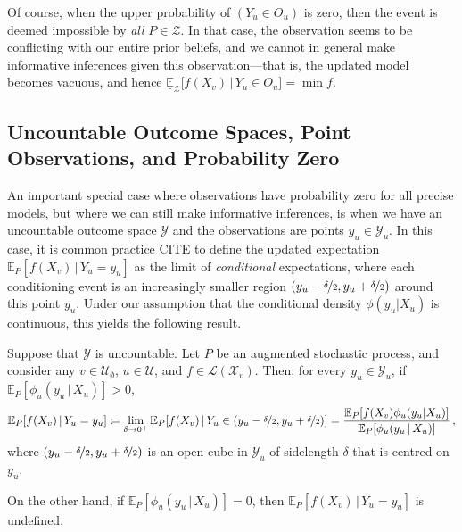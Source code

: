 \documentclass[twoside,11pt]{article}
\newcommand{\states}{\mathcal{X}}
\newcommand{\observs}{\mathcal{Y}}
\newcommand{\gambles}{\mathcal{L}}
\newcommand{\coloneqq}{:\!=}
\begin{document}
Of course, when the upper probability of $(Y_u\in O_u)$ is zero, then the event is deemed impossible by \emph{all} $P\in\mathcal{Z}$. In that case, the observation seems to be conflicting with our entire prior beliefs, and we cannot in general make informative inferences given this observation---that is, the updated model becomes vacuous, and hence $\underline{\mathbb{E}}_{\mathcal{Z}}\bigl[f(X_v)\,\vert\,Y_u\in O_u\bigr]=\min f$.

\subsection{Uncountable Outcome Spaces, Point Observations, and Probability Zero}

An important special case where observations have probability zero for all precise models, but where we can still make informative inferences, is when we have an uncountable outcome space $\observs$ and the observations are points $y_u\in\observs_u$. In this case, it is common practice CITE to define the updated expectation $\mathbb{E}_P[f(X_v)\,\vert\,Y_u=y_u]$ as the limit of \emph{conditional} expectations, where each conditioning event is an increasingly smaller region $(y_u-\nicefrac{\delta}{2},y_u+\nicefrac{\delta}{2})$ around this point $y_u$. Under our assumption that the conditional density $\phi(y_u\vert X_u)$ is continuous, this yields the following result.

\begin{proposition}\label{prop:precise_bayes_rule_densities}
Suppose that $\observs$ is uncountable. Let $P$ be an augmented stochastic process, and consider any $v\in\mathcal{U}_\emptyset$, $u\in\mathcal{U}$, and $f\in\gambles(\states_v)$. Then, for every $y_u\in\observs_u$, if $\mathbb{E}_P[\phi_u(y_u\,\vert\,X_u)]>0$,
\begin{equation}\label{eq:updated_expectation_is_limit}
\mathbb{E}_P[f(X_v)\,\vert\,Y_u=y_u] \coloneqq \lim_{\delta\to 0^+} \mathbb{E}_P[f(X_v)\,\vert\,Y_u\in (y_u-\nicefrac{\delta}{2},y_u+\nicefrac{\delta}{2})] = \frac{\mathbb{E}_P[f(X_v)\phi_u(y_u\vert X_u)]}{\mathbb{E}_P[\phi_u(y_u\,\vert\,X_u)]}\,,
\end{equation}
where $(y_u-\nicefrac{\delta}{2},y_u+\nicefrac{\delta}{2})$ is an open cube in $\observs_u$ of sidelength $\delta$ that is centred on $y_u$. 

On the other hand, if $\mathbb{E}_P[\phi_u(y_u\,\vert\,X_u)]=0$, then $\mathbb{E}_P[f(X_v)\,\vert\,Y_u=y_u]$ is undefined.
\end{proposition}
\end{document}
